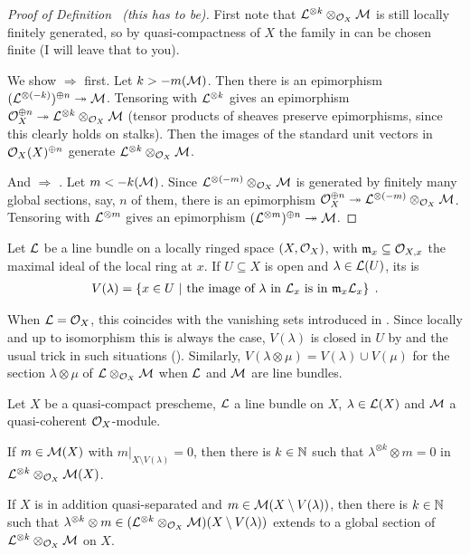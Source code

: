 \documentclass[a4paper,parskip=half,numbers=enddot, DIV=12]{scrreprt}
\begin{document}
\begin{proof}[Proof of Definition~ (this has to be)]
	First note that $\mathcal{L}^{\otimes k}\otimes_{\mathcal{O}_X}\mathcal{M}$ is still locally finitely generated, so by quasi-compactness of $X$ the family in  can be chosen finite (I will leave that to you).
	
	We show  $\Rightarrow$  first. Let $k>-m(\mathcal{M})$. Then there is an epimorphism $(\Ll^{\otimes (-k)})^{\oplus n}\epimorphism \Mm$. Tensoring with $\mathcal{L}^{\otimes k}$ gives an epimorphism $\Oo_X^{\oplus n}\epimorphism \Ll^{\otimes k}\otimes_{\Oo_X}\Mm$ (tensor products of sheaves preserve epimorphisms, since this clearly holds on stalks). Then the images of the standard unit vectors in $\mathcal{O}_X(X)^{\oplus n}$ generate $\mathcal{L}^{\otimes k}\otimes_{\mathcal{O}_X}\mathcal{M}$.
	
	And  $\Rightarrow$ . Let $m<-k(\mathcal{M})$. Since $\mathcal{L}^{\otimes(-m)}\otimes_{\mathcal{O}_X}\mathcal{M}$ is generated by finitely many global sections, say, $n$ of them, there is an epimorphism $\Oo_X^{\oplus n}\epimorphism\Ll^{\otimes(-m)}\otimes_{\Oo_X}\Mm$. Tensoring with $\mathcal{L}^{\otimes m}$ gives an epimorphism $(\Ll^{\otimes m})^{\oplus n}\epimorphism\Mm$.
\end{proof}
\begin{defi}
	Let $\mathcal{L}$ be a line bundle on a locally ringed space $(X,\mathcal{O}_X)$, with $\mathfrak{m}_x\subseteq \mathcal{O}_{X,x}$ the maximal ideal of the local ring at $x$. If $U\subseteq X$ is open and $\lambda\in\mathcal{L}(U)$, its  is
	\begin{align*}
		V(\lambda)=\left\{x\in U\ \middle|\ \text{the image of }\lambda\text{ in }\mathcal{L}_x\text{ is in }\mathfrak{m}_x\mathcal{L}_x\right\}\;.
	\end{align*}
\end{defi}
\begin{rem*}
	When $\mathcal{L}=\mathcal{O}_X$, this coincides with the vanishing sets introduced in \cite[Definition~1.3.3]{alggeo1}. Since locally and up to isomorphism this is always the case, $V(\lambda)$ is closed in $U$ by \cite[Fact~1.3.1]{alggeo1} and the usual trick in such situations (\cite[Remark~1.1.4]{alggeo1}). Similarly, $V(\lambda\otimes \mu)=V(\lambda)\cup V(\mu)$ for the section $\lambda\otimes\mu$ of $\mathcal{L}\otimes_{\mathcal{O}_X}\mathcal{M}$ when $\mathcal{L}$ and $\mathcal{M}$ are line bundles. 
\end{rem*}
\begin{lem}
	Let $X$ be a quasi-compact prescheme, $\mathcal{L}$ a line bundle on $X$, $\lambda\in\mathcal{L}(X)$ and $\mathcal{M}$ a quasi-coherent $\mathcal{O}_X$-module.
	\begin{alphanumerate}
		\item If $m\in\mathcal{M}(X)$ with $m|_{X\setminus V(\lambda)}=0$, then there is $k\in\mathbb{N}$ such that $\lambda^{\otimes k}\otimes m=0$ in $\mathcal{L}^{\otimes k}\otimes_{\mathcal{O}_X}\mathcal{M}(X)$.
		\item If $X$ is in addition quasi-separated and $m\in\mathcal{M}(X\setminus V(\lambda))$, then there is $k\in\mathbb{N}$ such that $\lambda^{\otimes k}\otimes m\in(\mathcal{L}^{\otimes k}\otimes_{\mathcal{O}_X}\mathcal{M})(X\setminus V(\lambda))$ extends to a global section of $\mathcal{L}^{\otimes k}\otimes_{\mathcal{O}_X}\mathcal{M}$ on $X$.
	\end{alphanumerate}
\end{lem}
\end{document}
